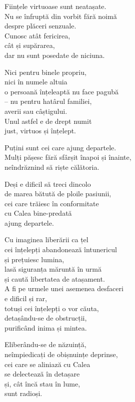 Ființele virtuoase sunt neatașate.\\
Nu se înfruptă din vorbit fără noimă\\
despre plăceri senzuale.\\
Cunosc atât fericirea,\\
cât și supărarea,\\
dar nu sunt posedate de niciuna.


Nici pentru binele propriu,\\
nici în numele altuia\\
o persoană înțeleaptă nu face pagubă\\
– nu pentru hatârul familiei,\\
averii sau câștigului.\\
Unul astfel e de drept numit\\
just, virtuos și înțelept.


Puțini sunt cei care ajung departele.\\
Mulți pășesc fără sfârșit înapoi și înainte,\\
neîndrăznind să riște călătoria.


Deși e dificil să treci dincolo\\
de marea bătută de ploile pasiunii,\\
cei care trăiesc în conformitate\\
cu Calea bine-predată\\
ajung departele.


Cu imaginea liberării ca țel\\
cei înțelepți abandonează întunericul\\
și prețuiesc lumina,\\
lasă siguranța măruntă în urmă\\
și caută libertatea de atașament.\\
A fi pe urmele unei asemenea desfaceri\\
e dificil și rar,\\
totuși cei înțelepți o vor căuta,\\
detașându-se de obstrucții,\\
purificând inima și mintea.


Eliberându-se de năzuință,\\
neîmpiedicați de obișnuințe deprinse,\\
cei care se aliniază cu Calea\\
se delectează în detașare\\
și, cât încă stau în lume,\\
sunt radioși.

